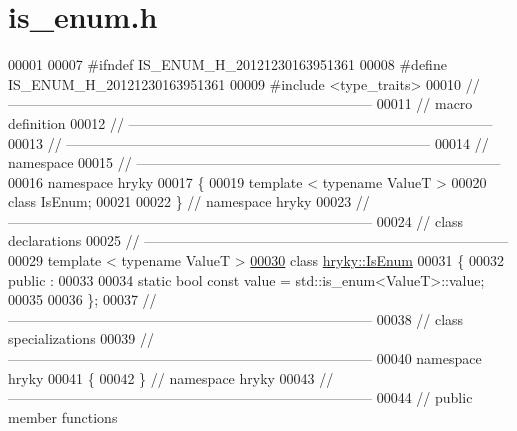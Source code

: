 \hypertarget{is__enum_8h_source}{\section{is\-\_\-enum.\-h}
}

\begin{DoxyCode}
00001 
00007 \textcolor{preprocessor}{#ifndef IS\_ENUM\_H\_20121230163951361}
00008 \textcolor{preprocessor}{}\textcolor{preprocessor}{#define IS\_ENUM\_H\_20121230163951361}
00009 \textcolor{preprocessor}{}\textcolor{preprocessor}{#include <type\_traits>}
00010 \textcolor{comment}{//
      ------------------------------------------------------------------------------}
00011 \textcolor{comment}{// macro definition}
00012 \textcolor{comment}{//
      ------------------------------------------------------------------------------}
00013 \textcolor{comment}{//
      ------------------------------------------------------------------------------}
00014 \textcolor{comment}{// namespace}
00015 \textcolor{comment}{//
      ------------------------------------------------------------------------------}
00016 \textcolor{keyword}{namespace }hryky
00017 \{
00019     \textcolor{keyword}{template} < \textcolor{keyword}{typename} ValueT >
00020     \textcolor{keyword}{class }IsEnum;
00021 
00022 \} \textcolor{comment}{// namespace hryky}
00023 \textcolor{comment}{//
      ------------------------------------------------------------------------------}
00024 \textcolor{comment}{// class declarations}
00025 \textcolor{comment}{//
      ------------------------------------------------------------------------------}
00029 \textcolor{comment}{}\textcolor{keyword}{template} < \textcolor{keyword}{typename} ValueT >
\hypertarget{is__enum_8h_source_l00030}{}\hyperlink{classhryky_1_1_is_enum}{00030} \textcolor{keyword}{class }\hyperlink{classhryky_1_1_is_enum}{hryky::IsEnum}
00031 \{
00032 \textcolor{keyword}{public} :
00033 
00034     \textcolor{keyword}{static} \textcolor{keywordtype}{bool} \textcolor{keyword}{const} value = std::is\_enum<ValueT>::value;
00035 
00036 \};
00037 \textcolor{comment}{//
      ------------------------------------------------------------------------------}
00038 \textcolor{comment}{// class specializations}
00039 \textcolor{comment}{//
      ------------------------------------------------------------------------------}
00040 \textcolor{keyword}{namespace }hryky
00041 \{
00042 \} \textcolor{comment}{// namespace hryky}
00043 \textcolor{comment}{//
      ------------------------------------------------------------------------------}
00044 \textcolor{comment}{// public member functions}

\end{DoxyCode}
